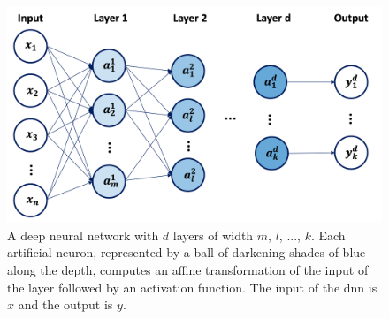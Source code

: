 \begin{figure}[h!]
    \center
    \begin{minipage}[l]{0.38\textwidth}
        \caption{A deep neural network with $d$ layers of width $m$, $l$, ..., $k$. Each artificial neuron, represented by a ball of darkening shades of blue along the depth, computes an affine transformation of the input of the layer followed by an activation function. The input of the \gls{dnn} is $x$ and the output is $y$.} 
    \label{fig:neuralnet}
      \end{minipage}
      \begin{minipage}[c]{0.6\textwidth}
        \includegraphics[width=\textwidth]{Images/ML/neuralnet.png}
      \end{minipage}
\end{figure}


